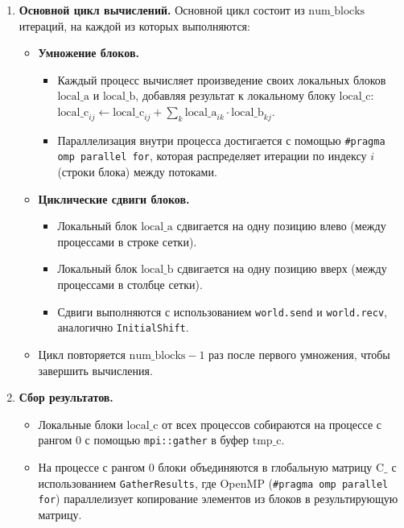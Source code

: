 \documentclass[a4paper,12pt]{article}
\begin{document}
\begin{enumerate}
    \item \textbf{Основной цикл вычислений.}
    Основной цикл состоит из \( \text{num\_blocks} \) итераций, на каждой из которых выполняются:
    \begin{itemize}
        \item \textbf{Умножение блоков.}
        \begin{itemize}
            \item Каждый процесс вычисляет произведение своих локальных блоков \( \text{local\_a} \) и \( \text{local\_b} \), добавляя результат к локальному блоку \( \text{local\_c} \): \( \text{local\_c}_{ij} \gets \text{local\_c}_{ij} + \sum_k \text{local\_a}_{ik} \cdot \text{local\_b}_{kj} \).
            \item Параллелизация внутри процесса достигается с помощью \texttt{\#pragma omp parallel for}, которая распределяет итерации по индексу \( i \) (строки блока) между потоками.
        \end{itemize}
        \item \textbf{Циклические сдвиги блоков.}
        \begin{itemize}
            \item Локальный блок \( \text{local\_a} \) сдвигается на одну позицию влево (между процессами в строке сетки).
            \item Локальный блок \( \text{local\_b} \) сдвигается на одну позицию вверх (между процессами в столбце сетки).
            \item Сдвиги выполняются с использованием \texttt{world.send} и \texttt{world.recv}, аналогично \texttt{InitialShift}.
        \end{itemize}
        \item Цикл повторяется \( \text{num\_blocks} - 1 \) раз после первого умножения, чтобы завершить вычисления.
    \end{itemize}
    \item \textbf{Сбор результатов.}
    \begin{itemize}
        \item Локальные блоки \( \text{local\_c} \) от всех процессов собираются на процессе с рангом 0 с помощью \texttt{mpi::gather} в буфер \( \text{tmp\_c} \).
        \item На процессе с рангом 0 блоки объединяются в глобальную матрицу \( \text{C\_} \) с использованием \texttt{GatherResults}, где OpenMP (\texttt{\#pragma omp parallel for}) параллелизует копирование элементов из блоков в результирующую матрицу.
    \end{itemize}
\end{enumerate}
\end{document}

